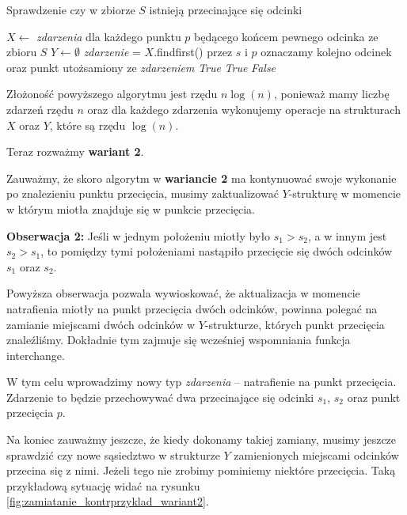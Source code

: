\begin{algorithm}[H]
	\caption{Sprawdzenie czy w zbiorze $S$ istnieją przecinające się odcinki}
	\begin{algorithmic}[1]
		\State $X \gets$ \textit{zdarzenia} dla każdego punktu $p$ będącego
		końcem pewnego odcinka ze zbioru $S$
		\State $Y \gets \emptyset$
		\State \textit{zdarzenie} = $X.$findfirst()
		\State przez $s$ i $p$ oznaczamy
		kolejno odcinek oraz punkt utożsamiony ze \textit{zdarzeniem}
		\State \Return \textit{True}
		\EndIf
		\Else
		\State \Return \textit{True}
		\EndIf
		\EndIf
		\EndWhile
		\State \Return \textit{False}
		\EndProcedure
	\end{algorithmic}
	\label{HasIntersectingSegments1}
\end{algorithm}

Złożoność powyższego algorytmu jest rzędu $n\log(n)$, ponieważ mamy liczbę zdarzeń
rzędu $n$ oraz dla każdego zdarzenia wykonujemy operacje na strukturach $X$ 
oraz $Y$, które są rzędu $\log(n)$.

Teraz rozważmy \textbf{wariant 2}.

Zauważmy, że skoro algorytm w \textbf{wariancie 2} ma kontynuować swoje wykonanie po znalezieniu punktu
przecięcia, musimy zaktualizować $Y$-strukturę w momencie w którym
miotła znajduje się w punkcie przecięcia. 

\textbf{Obserwacja 2:} Jeśli w jednym położeniu miotły było $s_1 > s_2$, a w innym 
jest $s_2 > s_1$, to pomiędzy tymi położeniami nastąpiło przecięcie się
dwóch odcinków $s_1$ oraz $s_2$.

Powyższa obserwacja pozwala wywioskować, że aktualizacja w momencie 
natrafienia miotły na punkt przecięcia dwóch odcinków, powinna polegać
na zamianie miejscami dwóch odcinków w $Y$-strukturze, których punkt przecięcia znaleźliśmy. Dokładnie tym zajmuje się wcześniej wspomniania funkcja interchange.

W tym celu wprowadzimy nowy typ \textit{zdarzenia} -- natrafienie na punkt 
przecięcia. Zdarzenie to będzie przechowywać dwa przecinające się 
odcinki $s_1$, $s_2$ oraz punkt przecięcia $p$.

Na koniec zauważmy jeszcze, że kiedy dokonamy takiej zamiany, musimy 
jeszcze sprawdzić czy nowe sąsiedztwo w strukturze $Y$  zamienionych miejscami 
odcinków przecina się z nimi. Jeżeli tego nie zrobimy pominiemy niektóre przecięcia.
Taką przykładową sytuację widać na rysunku \ref{fig:zamiatanie_kontrprzyklad_wariant2}.

